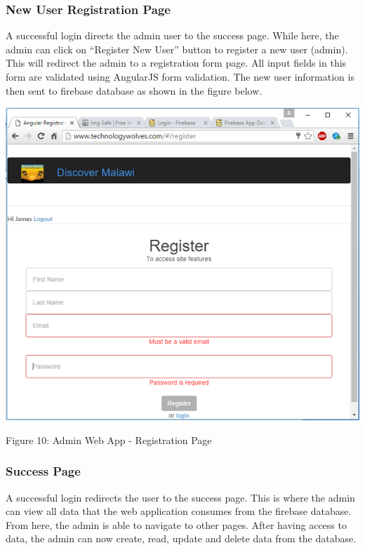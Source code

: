 \paragraph{}

\subsubsection{New User Registration Page}
A successful login directs the admin user to the success page. While here, the admin can click on “Register New User” button to register a new user (admin). This will redirect the admin to a registration form page. All input fields in this form are validated using AngularJS form validation. The new user information is then sent to firebase database as shown in the figure below.

\begin{center}    
	\includegraphics{img/register.png}
\end{center}
\begin{center}
	Figure 10: Admin Web App - Registration Page
\end{center}
\paragraph{}

\subsubsection{Success Page}
A successful login redirects the user to the success page. This is where the admin can view all data that the web application consumes from the firebase database. From here, the admin is able to navigate to other pages. After having access to data, the admin can now create, read, update and delete data from the database.

